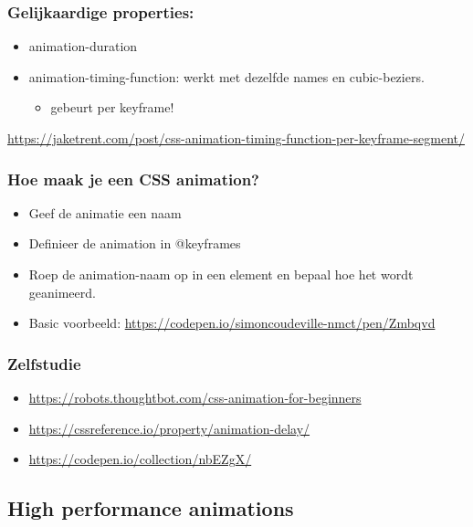 \documentclass{article}
\begin{document}
\subsubsection{Gelijkaardige properties:}

\begin{itemize}
    \item animation-duration
    \item animation-timing-function: werkt met dezelfde names en cubic-beziers.
    \begin{itemize}
        \item gebeurt per keyframe!
    \end{itemize}
\end{itemize}

\url{https://jaketrent.com/post/css-animation-timing-function-per-keyframe-segment/}

\subsubsection{Hoe maak je een CSS animation?}

\begin{itemize}
    \item Geef de animatie een naam
    \item Definieer de animation in @keyframes
    \item Roep de animation-naam op in een element en bepaal hoe het wordt geanimeerd.
    \item Basic voorbeeld: \url{https://codepen.io/simoncoudeville-nmct/pen/Zmbqvd}
\end{itemize}

\subsubsection{Zelfstudie}

\begin{itemize}
    \item \url{https://robots.thoughtbot.com/css-animation-for-beginners}
    \item \url{https://cssreference.io/property/animation-delay/}
    \item \url{https://codepen.io/collection/nbEZgX/}
\end{itemize}

\subsection{High performance animations}
\end{document}
